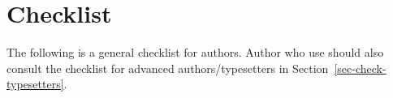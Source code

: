 \section{Checklist}

The following is a general checklist for authors. Author who use \latex should also consult the
checklist for advanced authors/typesetters in Section~\ref{sec-check-typesetters}.



















